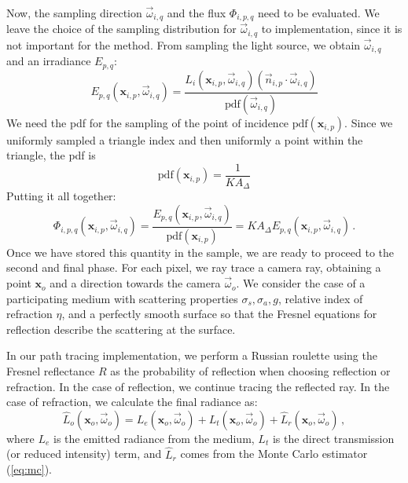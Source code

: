 \documentclass[10pt,a4paper]{article}
\begin{document}
Now, the sampling direction $\vec{\omega}_{i,q}$ and the flux $\Phi_{i,p,q}$ need to be evaluated. We leave the choice of the sampling distribution for $\vec{\omega}_{i,q}$ to implementation, since it is not important for the method. From sampling the light source, we obtain $\vec{\omega}_{i,q}$ and an irradiance $E_{p,q}$:
\begin{equation*}
E_{p,q}(\mathbf{x}_{i,p}, \vec{\omega}_{i,q}) = \frac{L_i(\mathbf{x}_{i,p}, \vec{\omega}_{i,q}) (\vec{n}_{i,p} \cdot \vec{\omega}_{i,q})}{\text{pdf}(\vec{\omega}_{i,q})}
\end{equation*}
We need the pdf for the sampling of the point of incidence $\text{pdf}(\mathbf{x}_{i,p})$. Since we uniformly sampled a triangle index and then uniformly a point within the triangle, the pdf is
\begin{equation*}
\text{pdf}(\mathbf{x}_{i,p}) = \frac{1}{K A_\Delta}
\end{equation*}
Putting it all together:
\begin{equation*}
\Phi_{i,p,q}(\mathbf{x}_{i,p}, \vec{\omega}_{i,q})  = \frac{E_{p,q}(\mathbf{x}_{i,p}, \vec{\omega}_{i,q}) }{\text{pdf}(\mathbf{x}_{i,p})} = K A_\Delta E_{p,q}(\mathbf{x}_{i,p}, \vec{\omega}_{i,q}) \, .
\end{equation*}
Once we have stored this quantity in the sample, we are ready to proceed to the second and final phase. For each pixel, we ray trace a camera ray, obtaining a point $\mathbf{x}_o$ and a direction towards the camera $\vec{\omega}_o$. We consider the case of a participating medium with scattering properties $\sigma_s, \sigma_a, g$, relative index of refraction $\eta$, and a perfectly smooth surface so that the Fresnel equations for reflection describe the scattering at the surface.

In our path tracing implementation, we perform a Russian roulette using the Fresnel reflectance $R$ as the probability of reflection when choosing reflection or refraction. In the case of reflection, we continue tracing the reflected ray. In the case of refraction, we calculate the final radiance as:
\begin{equation*}
\hat{L}_o(\mathbf{x}_o, \vec{\omega}_o) = L_e(\mathbf{x}_o, \vec{\omega}_o) + L_t(\mathbf{x}_o, \vec{\omega}_o) + \hat{L}_r(\mathbf{x}_o, \vec{\omega}_o) \, ,
\end{equation*}
where $L_e$ is the emitted radiance from the medium, $L_t$ is the direct transmission (or reduced intensity) term, and $\hat{L}_r$ comes from the Monte Carlo estimator (\ref{eq:mc}).
\end{document}
